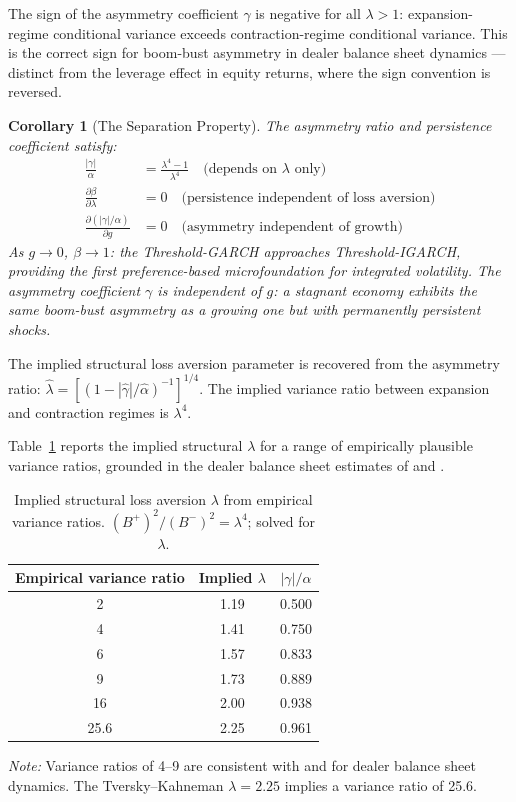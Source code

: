 \documentclass[12pt,a4paper]{article}
\newtheorem{corollary}[theorem]{Corollary}
\theoremstyle{definition}
\begin{document}
The sign of the asymmetry coefficient $\gamma$ is negative for all
$\lambda > 1$: expansion-regime conditional variance exceeds
contraction-regime conditional variance. This is the correct sign for
boom-bust asymmetry in dealer balance sheet dynamics --- distinct from
the leverage effect in equity returns, where the sign convention is
reversed.

\begin{corollary}[The Separation Property]
\label{cor:separation}
The asymmetry ratio and persistence coefficient satisfy:
\begin{align}
  \frac{|\gamma|}{\alpha} &= \frac{\lambda^4 - 1}{\lambda^4}
    \quad \text{(depends on $\lambda$ only)} \\
  \frac{\partial\beta}{\partial\lambda} &= 0
    \quad \text{(persistence independent of loss aversion)} \\
  \frac{\partial(|\gamma|/\alpha)}{\partial g} &= 0
    \quad \text{(asymmetry independent of growth)}
\end{align}
As $g \to 0$, $\beta \to 1$: the Threshold-GARCH approaches
Threshold-IGARCH, providing the first preference-based microfoundation
for integrated volatility. The asymmetry coefficient $\gamma$ is
independent of $g$: a stagnant economy exhibits the same boom-bust
asymmetry as a growing one but with permanently persistent shocks.
\end{corollary}

The implied structural loss aversion parameter is recovered from
the asymmetry ratio: $\hat{\lambda} = [(1 - |\hat{\gamma}|/
\hat{\alpha})^{-1}]^{1/4}$. The implied variance ratio between
expansion and contraction regimes is $\lambda^4$.

Table~\ref{tab:lambda_implied} reports the implied structural
$\lambda$ for a range of empirically plausible variance ratios,
grounded in the dealer balance sheet estimates of
\citet{adrian2010} and \citet{brunnermeier2009}.

\begin{table}[ht]
\centering
\caption{Implied structural loss aversion $\lambda$ from empirical
variance ratios. $(B^+)^2/(B^-)^2 = \lambda^4$; solved for $\lambda$.}
\label{tab:lambda_implied}
\begin{tabular}{ccc}
\toprule
Empirical variance ratio & Implied $\lambda$ & $|\gamma|/\alpha$ \\
\midrule
2   & 1.19 & 0.500 \\
4   & 1.41 & 0.750 \\
6   & 1.57 & 0.833 \\
9   & 1.73 & 0.889 \\
16  & 2.00 & 0.938 \\
25.6 & 2.25 & 0.961 \\
\bottomrule
\end{tabular}
\medskip

\noindent\footnotesize{\textit{Note:} Variance ratios of 4--9 are
consistent with \citet{adrian2010} and \citet{brunnermeier2009} for
dealer balance sheet dynamics. The Tversky--Kahneman $\lambda = 2.25$
implies a variance ratio of 25.6.}
\end{table}
\end{document}

